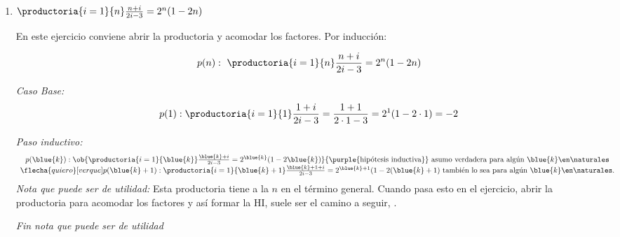 \begin{enumerate}[label=\roman*)]
        también lo sea.\par
        Arranco de $p(k+1)$ y usando la  trato de llegar
        al valor esperado:
        $$
          \productoria{i=1}{k+1} ( 1 + a^{2^{i-1}} )
          \igual{\red{!}}
          (1 + a^{2^k}) \cdot \productoria{i=1}{k}( 1 + a^{2^{i-1}} )
          \igual{\purple{HI}}
          (1 + a^{2^k}) \cdot
          \frac{1-a^{2^k}}{1-a}
          \igual{\red{!!}}
          \frac{1 - ( a^{2^k})^2}{1-a} =
          \frac{1 - a^{2 \cdot 2^k}}{1-a} = \frac{1 - a^{2^{k+1}}}{1-a}\Tilde
        $$
        Si te quedaste pedaleando en los \red{!}, pensá en \textit{diferencia de cuadrados}, \textit{propiedades de potencias} y coso .\par
        Esto muetra que $p(k+1)$ también es verdadera.\par
        Como $p(1),\, p(k) \ytext p(k+1)$ son verdaderas por el principio de inducción $p(n)$ es verdadera $\paratodo n \en \naturales$.

  \item
        $\productoria{i=1}{n} \frac{n+i}{2i-3} = 2^n (1 -2n)$\par
        En este ejercicio conviene abrir la productoria y acomodar los factores. Por inducción:\par
        $$
          p(n):\ \productoria{i=1}{n} \frac{n+i}{2i-3} = 2^n (1 -2n)
        $$

        \textit{Caso Base: }
        $$
          p(1) : \productoria{i=1}{1} \frac{1+i}{2i-3} = \frac{1+1}{2 \cdot 1 - 3} = 2^1 (1 - 2\cdot 1) = -2
        $$

        \textit{Paso inductivo: }
        $$
          \begin{array}{c}
            p(\blue{k}): \ob{\productoria{i=1}{\blue{k}} \frac{\blue{k}+i}{2i-3} = 2^{\blue{k}} (1 -2\blue{k})}{\purple{\text{hipótesis inductiva}}}
            \text{ asumo verdadera para algún }\blue{k} \en \naturales \\
            \flecha{quiero}[ver que] p(\blue{k}+1): \productoria{i=1}{\blue{k}+1} \frac{\blue{k}+1+i}{2i-3} = 2^{\blue{k}+1} (1 -2(\blue{k}+1)
            \text{ también lo sea para algún } \blue{k} \en \naturales.
          \end{array}
        $$
        \textit{Nota que puede ser de utilidad:}
        Esta productoria tiene a la $n$ en el término general. Cuando pasa esto en el ejercicio, abrir la productoria
        para acomodar los factores y así formar la HI, suele ser el camino a seguir, .\par
        \textit{Fin nota que puede ser de utilidad}


\end{enumerate}
